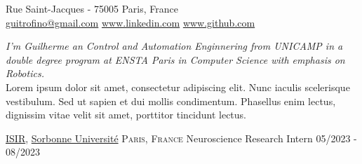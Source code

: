 \documentclass[10pt, a4paper]{article}
\begin{document}
 



 Rue Saint-Jacques - 75005 Paris, France\\         %
\href{mailto:guitrofino@gmail.com}{guitrofino@gmail.com}\bull   %
\href{https://www.linkedin.com/in/guilherme-trofino/}{www.linkedin.com}\bull %
\href{https://github.com/tr0fin0}{www.github.com}               %

\spacedhrule{0.9em}{-0.4em}


\vspace{-1.3em}

\begin{multicols}{2}
\noindent \textit{I'm Guilherme an Control and Automation Enginnering from UNICAMP in a double degree program at ENSTA Paris in Computer Science with emphasis on Robotics.}\\

\noindent Lorem ipsum dolor sit amet, consectetur adipiscing elit. Nunc iaculis scelerisque vestibulum. Sed ut sapien et dui mollis condimentum. Phasellus enim lectus, dignissim vitae velit sit amet, porttitor tincidunt lectus.
\end{multicols}

\spacedhrule{0.5em}{-0.4em}



\headedsection
    {\href{https://www.isir.upmc.fr/?lang=en}{ISIR}, \href{https://www.sorbonne-universite.fr/}{Sorbonne Université}}
    {\textsc{Paris, France}}
    {
        \headedsubsection
        {Neuroscience Research Intern}
        {05/2023 - 08/2023}
        {}
    }
\end{document}
